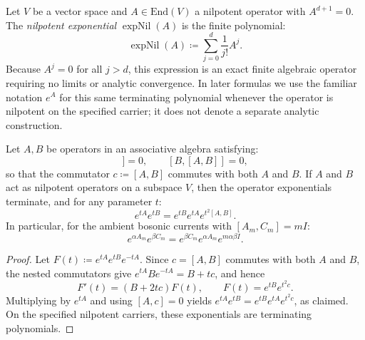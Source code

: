 \begin{definition}
Let $V$ be a vector space and $A \in \mathrm{End}(V)$ a nilpotent operator with $A^{d+1} = 0$. The \emph{nilpotent exponential} $\operatorname{expNil}(A)$ is the finite polynomial:
\begin{equation}
\operatorname{expNil}(A) \coloneqq \sum_{j=0}^d \frac{1}{j!} A^j.
\end{equation}
Because $A^{j} = 0$ for all $j > d$, this expression is an exact finite algebraic operator requiring no limits or analytic convergence. In later formulas we use the familiar notation $e^A$ for this same terminating polynomial whenever the operator is nilpotent on the specified carrier; it does not denote a separate analytic construction.
\end{definition}

\begin{theorem}
\label{thm:bch}
Let $A, B$ be operators in an associative algebra satisfying:
\begin{equation}
[A, [A, B]] = 0, \qquad [B, [A, B]] = 0,
\end{equation}
so that the commutator $c \coloneqq [A, B]$ commutes with both $A$ and $B$.
If $A$ and $B$ act as nilpotent operators on a subspace $V$, then the operator exponentials terminate, and for any parameter $t$:
\begin{equation}
e^{t A} e^{t B} = e^{t B} e^{t A} e^{t^2 [A, B]}.
\end{equation}
In particular, for the ambient bosonic currents with $[A_m, C_m] = m I$:
\begin{equation}
e^{\alpha A_m} e^{\beta C_m} = e^{\beta C_m} e^{\alpha A_m} e^{m \alpha \beta I}.
\end{equation}
\end{theorem}

\begin{proof}
Let $F(t)\coloneqq e^{tA}e^{tB}e^{-tA}$. Since $c=[A,B]$ commutes with both $A$ and $B$, the nested commutators give $e^{tA}Be^{-tA}=B+tc$, and hence
\begin{equation}
F'(t)=(B+2tc)F(t),\qquad F(t)=e^{tB}e^{t^2c}.
\end{equation}
Multiplying by $e^{tA}$ and using $[A,c]=0$ yields $e^{tA}e^{tB}=e^{tB}e^{tA}e^{t^2c}$, as claimed. On the specified nilpotent carriers, these exponentials are terminating polynomials.
\end{proof}


